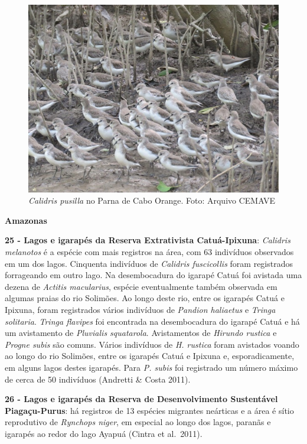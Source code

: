\documentclass[
  oneside]{scrbook}
\begin{document}
\begin{figure}[H]

{\centering \includegraphics[width=0.75\linewidth]{imagens/cap07/Figura_7.4} 

}

\caption{\emph{Calidris pusilla} no Parna de Cabo Orange. Foto: Arquivo CEMAVE}\label{fig:24}
\end{figure}



\textbf{Amazonas}

\textbf{25 - Lagos e igarapés da Reserva Extrativista Catuá-Ipixuna}: \emph{Calidris melanotos} é a espécie com mais registros na área, com 63 indivíduos observados em um dos lagos. Cinquenta indivíduos de \emph{Calidris fuscicollis} foram registrados forrageando em outro lago. Na desembocadura do igarapé Catuá foi avistada uma dezena de \emph{Actitis macularius}, espécie eventualmente também observada em algumas praias do rio Solimões. Ao longo deste rio, entre os igarapés Catuá e Ipixuna, foram registrados vários indivíduos de \emph{Pandion haliaetus} e \emph{Tringa solitaria}. \emph{Tringa flavipes} foi encontrada na desembocadura do igarapé Catuá e há um avistamento de \emph{Pluvialis squatarola}. Avistamentos de \emph{Hirundo rustica} e \emph{Progne subis} são comuns. Vários indivíduos de \emph{H. rustica} foram avistados voando ao longo do rio Solimões, entre os igarapés Catuá e Ipixuna e, esporadicamente, em alguns lagos destes igarapés. Para \emph{P. subis} foi registrado um número máximo de cerca de 50 indivíduos (Andretti \& Costa 2011).

\textbf{26 - Lagos e igarapés da Reserva de Desenvolvimento Sustentável Piagaçu-Purus}: há registros de 13 espécies migrantes neárticas e a área é sítio reprodutivo de \emph{Rynchops niger}, em especial ao longo dos lagos, paranãs e igarapés ao redor do lago Ayapuá (Cintra et al.~2011).
\end{document}

